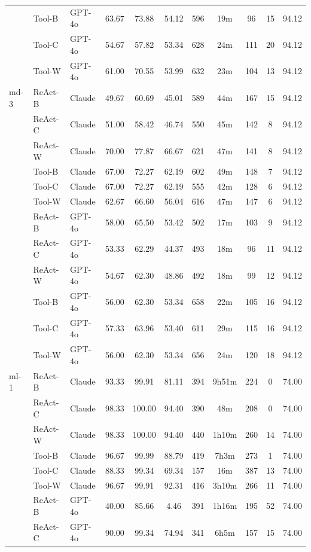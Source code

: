 \begin{longtable}{lllcccccccc}
 & Tool-B & GPT-4o & 63.67 & 73.88 & 54.12 & 596 & 19m & 96 & 15 & 94.12 \\
 & Tool-C & GPT-4o & 54.67 & 57.82 & 53.34 & 628 & 24m & 111 & 20 & 94.12 \\
 & Tool-W & GPT-4o & 61.00 & 70.55 & 53.99 & 632 & 23m & 104 & 13 & 94.12 \\
md-3 & ReAct-B & Claude & 49.67 & 60.69 & 45.01 & 589 & 44m & 167 & 15 & 94.12 \\
 & ReAct-C & Claude & 51.00 & 58.42 & 46.74 & 550 & 45m & 142 & 8 & 94.12 \\
 & ReAct-W & Claude & 70.00 & 77.87 & 66.67 & 621 & 47m & 141 & 8 & 94.12 \\
 & Tool-B & Claude & 67.00 & 72.27 & 62.19 & 602 & 49m & 148 & 7 & 94.12 \\
 & Tool-C & Claude & 67.00 & 72.27 & 62.19 & 555 & 42m & 128 & 6 & 94.12 \\
 & Tool-W & Claude & 62.67 & 66.60 & 56.04 & 616 & 47m & 147 & 6 & 94.12 \\
 & ReAct-B & GPT-4o & 58.00 & 65.50 & 53.42 & 502 & 17m & 103 & 9 & 94.12 \\
 & ReAct-C & GPT-4o & 53.33 & 62.29 & 44.37 & 493 & 18m & 96 & 11 & 94.12 \\
 & ReAct-W & GPT-4o & 54.67 & 62.30 & 48.86 & 492 & 18m & 99 & 12 & 94.12 \\
 & Tool-B & GPT-4o & 56.00 & 62.30 & 53.34 & 658 & 22m & 105 & 16 & 94.12 \\
 & Tool-C & GPT-4o & 57.33 & 63.96 & 53.40 & 611 & 29m & 115 & 16 & 94.12 \\
 & Tool-W & GPT-4o & 56.00 & 62.30 & 53.34 & 656 & 24m & 120 & 18 & 94.12 \\
ml-1 & ReAct-B & Claude & 93.33 & 99.91 & 81.11 & 394 & 9h51m & 224 & 0 & 74.00 \\
 & ReAct-C & Claude & 98.33 & 100.00 & 94.40 & 390 & 48m & 208 & 0 & 74.00 \\
 & ReAct-W & Claude & 98.33 & 100.00 & 94.40 & 440 & 1h10m & 260 & 14 & 74.00 \\
 & Tool-B & Claude & 96.67 & 99.99 & 88.79 & 419 & 7h3m & 273 & 1 & 74.00 \\
 & Tool-C & Claude & 88.33 & 99.34 & 69.34 & 157 & 16m & 387 & 13 & 74.00 \\
 & Tool-W & Claude & 96.67 & 99.91 & 92.31 & 416 & 3h10m & 266 & 11 & 74.00 \\
 & ReAct-B & GPT-4o & 40.00 & 85.66 & 4.46 & 391 & 1h16m & 195 & 52 & 74.00 \\
 & ReAct-C & GPT-4o & 90.00 & 99.34 & 74.94 & 341 & 6h5m & 157 & 15 & 74.00 \\

\end{longtable}
